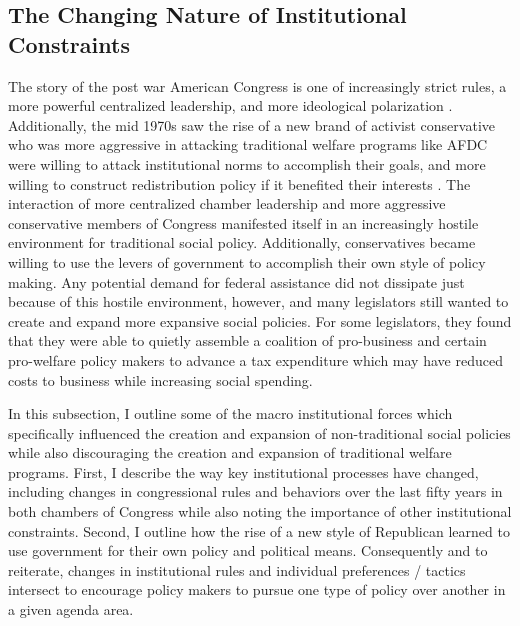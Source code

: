 \documentclass[12pt]{article}
\begin{document}
\subsection{The Changing Nature of Institutional Constraints}
The story of the post war American Congress is one of increasingly strict rules, a more powerful centralized leadership, and more ideological polarization \citep{rohde1991, binder2003}. Additionally, the mid 1970s saw the rise of a new brand of activist conservative who was more aggressive in attacking traditional welfare programs like AFDC were willing to attack institutional norms to accomplish their goals, and more willing to construct redistribution policy if it benefited their interests \citep{hacker2007, theriault2013}. The interaction of more centralized chamber leadership and more aggressive conservative members of Congress manifested itself in an increasingly hostile environment for traditional social policy. Additionally, conservatives became willing to use the levers of government to accomplish their own style of policy making. Any potential demand for federal assistance did not dissipate just because of this hostile environment, however, and many legislators still wanted to create and expand more expansive social policies. For some legislators, they found that they were able to quietly assemble a coalition of pro-business and certain pro-welfare policy makers to advance a tax expenditure which may have reduced costs to business while increasing social spending. 
 
In this subsection, I outline some of the macro institutional forces which specifically influenced the creation and expansion of non-traditional social policies while also discouraging the creation and expansion of traditional welfare programs. First, I describe the way key institutional processes have changed, including changes in congressional rules and behaviors over the last fifty years in both chambers of Congress while also noting the importance of other institutional constraints. Second, I outline how the rise of a new style of Republican learned to use government for their own policy and political means. Consequently and to reiterate, changes in institutional rules and individual preferences / tactics intersect to encourage policy makers to pursue one type of policy over another in a given agenda area.
\end{document}
